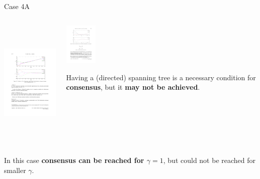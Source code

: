 \begin{frame}{Case 4A}

\begin{columns}
 \begin{column}{.70\textwidth}
	\begin{center}
		\includegraphics[height=6cm]{images/StatesCase4A.pdf}
	\end{center}
	\vskip 0.3cm
 \end{column}
 \begin{column}{.30\textwidth}
 	\vskip 0.3cm
	\begin{center}
		\includegraphics[height=2cm]{images/GraphCase4.pdf}
	\end{center}
	Having a (directed) spanning tree is a necessary condition for  
	{\textcolor{green!40!black}{\fontsize{13}{15}\textbf{consensus}}},
	but  it {\textcolor{green!40!black}{\fontsize{13}{15}\textbf{may not be achieved}}}.
 \end{column}
\end{columns}
In this case  {\textcolor{green!40!black}{\fontsize{13}{15}\textbf{consensus can be reached for $\gamma = 1$}}}, 
 but could not be reached for smaller $\gamma$.
\vskip 0.3cm
\end{frame}

